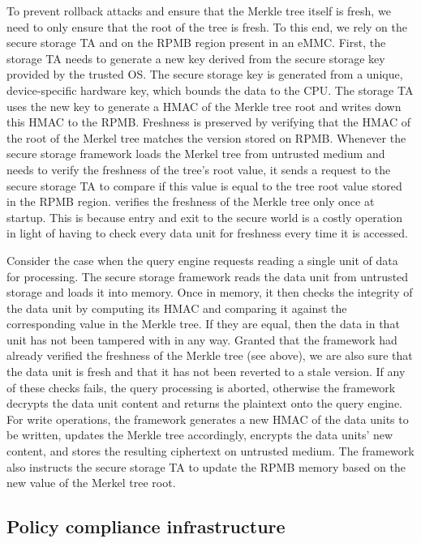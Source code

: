 To prevent rollback attacks and ensure that the Merkle tree itself is fresh, we need to only ensure that the root of the tree is fresh. To this end, we rely on the secure storage TA and on the RPMB region present in an eMMC. First, the storage TA needs to generate a new key derived from the secure storage key provided by the trusted OS. The secure storage key is generated from a unique, device-specific hardware key, which bounds the data to the CPU. The storage TA uses the new key to generate a HMAC of the Merkle tree root and writes down this HMAC to the RPMB. Freshness is preserved by verifying that the HMAC of the root of the Merkel tree matches the version stored on RPMB. Whenever the secure storage framework loads the Merkel tree from untrusted medium and needs to verify the freshness of the tree's root value, it sends a request to the secure storage TA to compare if this value is equal to the tree root value stored in the RPMB region. \project{} verifies the freshness of the Merkle tree only once at startup. This is because entry and exit to the secure world is a costly operation in light of having to check every data unit for freshness every time it is accessed.

Consider the case when the query engine requests reading a single unit of data for processing. The secure storage framework reads the data unit from untrusted storage and loads it into memory. Once in memory, it then checks the integrity of the data unit by computing its HMAC and comparing it against the corresponding value in the Merkle tree. If they are equal, then the data in that unit has not been tampered with in any way. Granted that the framework had already verified the freshness of the Merkle tree (see above), we are also sure that the data unit is fresh and that it has not been reverted to a stale version. If any of these checks fails, the query processing is aborted, otherwise the framework decrypts the data unit content and returns the plaintext onto the query engine. For write operations, the framework generates a new HMAC of the data units to be written, updates the Merkle tree accordingly, encrypts the data units' new content, and stores the resulting ciphertext on untrusted medium. The framework also instructs the secure storage TA to update the RPMB memory based on the new value of the Merkel tree root.

\subsection{Policy compliance infrastructure}
\label{subsec:design-trusted-monitor}


